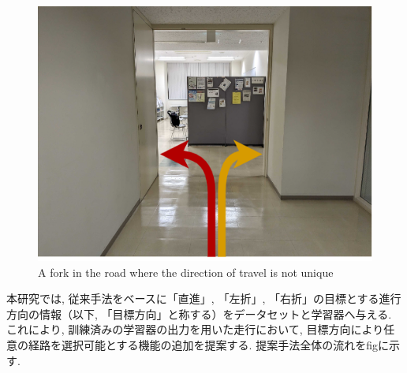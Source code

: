 \begin{figure}[hbtp]
     \centering
    \includegraphics[keepaspectratio, scale=0.5]
         {images/road.png}
    \caption{A fork in the road where the direction of travel is not unique}
    \label{Fig:road}
\end{figure}

\newpage

本研究では, 従来手法をベースに「直進」, 「左折」, 「右折」の目標とする進行方向の情報（以下, 「目標方向」と称する）をデータセットと学習器へ与える. これにより, 訓練済みの学習器の出力を用いた走行において, 目標方向により任意の経路を選択可能とする機能の追加を提案する. 提案手法全体の流れをfigに示す.

\newpage
